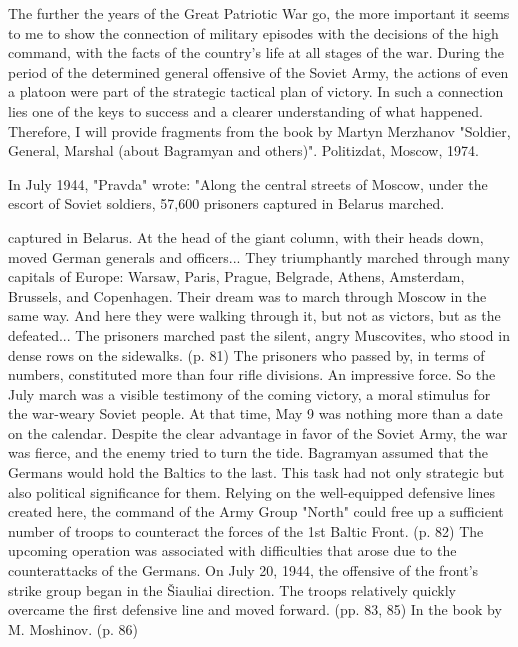 \label{2-2}
The further the years of the Great Patriotic War go, the more important it seems to me to show the connection of military episodes with the decisions of the high command, with the facts of the country's life at all stages of the war. During the period of the determined general offensive of the Soviet Army, the actions of even a platoon were part of the strategic tactical plan of victory. In such a connection lies one of the keys to success and a clearer understanding of what happened. Therefore, I will provide fragments from the book by Martyn Merzhanov "Soldier, General, Marshal (about Bagramyan and others)". Politizdat, Moscow, 1974.

\label{2-3}
In July 1944, "Pravda" wrote:
"Along the central streets of Moscow, under the escort of Soviet soldiers, 57,600 prisoners captured in Belarus marched.

\label{3-1}
captured in Belarus. At the head of the giant column, with their heads down, moved German generals and officers... They triumphantly marched through many capitals of Europe: Warsaw, Paris, Prague, Belgrade, Athens, Amsterdam, Brussels, and Copenhagen. Their dream was to march through Moscow in the same way. And here they were walking through it, but not as victors, but as the defeated... The prisoners marched past the silent, angry Muscovites, who stood in dense rows on the sidewalks. (p. 81) The prisoners who passed by, in terms of numbers, constituted more than four rifle divisions. An impressive force. So the July march was a visible testimony of the coming victory, a moral stimulus for the war-weary Soviet people. At that time, May 9 was nothing more than a date on the calendar. Despite the clear advantage in favor of the Soviet Army, the war was fierce, and the enemy tried to turn the tide. Bagramyan assumed that the Germans would hold the Baltics to the last. This task had not only strategic but also political significance for them. Relying on the well-equipped defensive lines created here, the command of the Army Group "North" could free up a sufficient number of troops to counteract the forces of the 1st Baltic Front. (p. 82) The upcoming operation was associated with difficulties that arose due to the counterattacks of the Germans. On July 20, 1944, the offensive of the front's strike group began in the Šiauliai direction. The troops relatively quickly overcame the first defensive line and moved forward. (pp. 83, 85) In the book by M. Moshinov. (p. 86)

\label{4-1}

